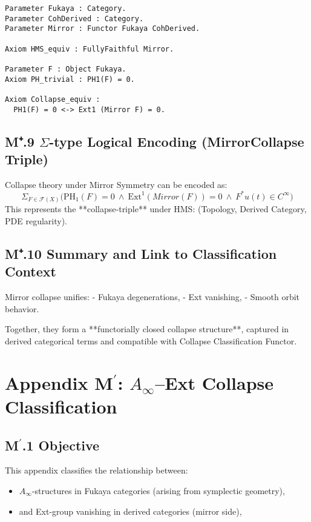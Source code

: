 \documentclass[11pt]{article}
\begin{document}
\begin{axiom}
\begin{axiom}
{{\begin{lstlisting}[language=Coq, caption=Collapse Functorial Equivalence in Coq Type Theory]
Parameter Fukaya : Category.
Parameter CohDerived : Category.
Parameter Mirror : Functor Fukaya CohDerived.

Axiom HMS_equiv : FullyFaithful Mirror.

Parameter F : Object Fukaya.
Axiom PH_trivial : PH1(F) = 0.

Axiom Collapse_equiv :
  PH1(F) = 0 <-> Ext1 (Mirror F) = 0.
\end{lstlisting}

\subsection*{M⁺.9 $\Sigma$-type Logical Encoding (MirrorCollapse Triple)}

Collapse theory under Mirror Symmetry can be encoded as:
\[
\Sigma_{F \in \mathcal{F}(X)} \Big( \mathrm{PH}_1(F) = 0 \ \wedge \ \mathrm{Ext}^1(Mirror(F)) = 0 \ \wedge \ F^\ast u(t) \in C^\infty \Big)
\]
This represents the **collapse-triple** under HMS:  
(Topology, Derived Category, PDE regularity).

\subsection*{M⁺.10 Summary and Link to Classification Context}

Mirror collapse unifies:
- Fukaya degenerations,
- Ext vanishing,
- Smooth orbit behavior.

Together, they form a **functorially closed collapse structure**,  
captured in derived categorical terms and compatible with Collapse Classification Functor.




\section*{Appendix M$^\prime$: $A_\infty$–Ext Collapse Classification}

\subsection*{M$^\prime$.1 Objective}

This appendix classifies the relationship between:

\begin{itemize}
  \item $A_\infty$-structures in Fukaya categories (arising from symplectic geometry),
  \item and Ext-group vanishing in derived categories (mirror side),
\end{itemize}

}}
\end{axiom}
\end{axiom}
\end{document}
